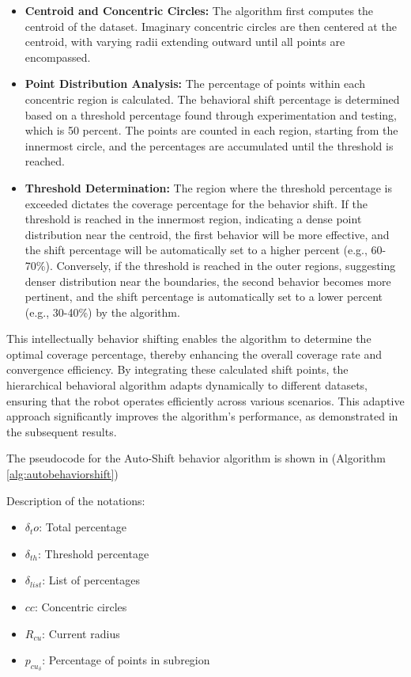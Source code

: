 \begin{itemize}
    \item \textbf{Centroid and Concentric Circles:  }The algorithm first computes the centroid of the dataset. Imaginary concentric circles are then centered at the centroid, with varying radii extending outward until all points are encompassed.
    \item \textbf{Point Distribution Analysis:  }The percentage of points within each concentric region is calculated. The behavioral shift percentage is determined based on a threshold percentage found through experimentation and testing, which is 50 percent. The points are counted in each region, starting from the innermost circle, and the percentages are accumulated until the threshold is reached.
    \item \textbf{Threshold Determination:  }The region where the threshold percentage is exceeded dictates the coverage percentage for the behavior shift. If the threshold is reached in the innermost region, indicating a dense point distribution near the centroid, the first behavior will be more effective, and the shift percentage will be automatically set to a higher percent (e.g., 60-70\%). Conversely, if the threshold is reached in the outer regions, suggesting denser distribution near the boundaries, the second behavior becomes more pertinent, and the shift percentage is automatically set to a lower percent (e.g., 30-40\%) by the algorithm.
\end{itemize} 

\vspace*{6mm}   

This intellectually behavior shifting enables the algorithm to determine the optimal coverage percentage, thereby enhancing the overall coverage rate and convergence efficiency. By integrating these calculated shift points, the hierarchical behavioral algorithm adapts dynamically to different datasets, ensuring that the robot operates efficiently across various scenarios. This adaptive approach significantly improves the algorithm's performance, as demonstrated in the subsequent results.  

\vspace*{6mm}   

The pseudocode for the Auto-Shift behavior algorithm is shown in (Algorithm \autoref{alg:autobehaviorshift})



Description of the notations:
\begin{multicols}{2}
    \begin{itemize}[noitemsep,topsep=0pt]
        \item $\delta_to$: Total percentage
        \item $\delta_{th}$: Threshold percentage
        \item $\delta_{list}$: List of percentages
        \item $cc$: Concentric circles
        \item $R_{cu}$: Current radius
        \item $p_{cu_\delta}$: Percentage of points in subregion
    \end{itemize}
\end{multicols}

